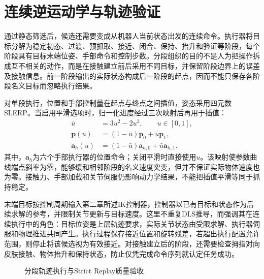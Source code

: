 \section{连续逆运动学与轨迹验证}
\label{sec:grasp_trajectory_verification}

通过静态筛选后，候选还需要变成从机器人当前状态出发的连续命令。执行器将目标分解为稳定初态、过渡、预抓取、接近、闭合、保持、抬升和验证等阶段，每个阶段具有目标末端位姿、手部命令和控制步数。分段组织的目的不是人为把操作拆成互不相关的动作，而是在接触建立前后采用不同目标，并保留阶段边界上的误差及接触信息。前一阶段输出的实际状态构成后一阶段的起点，因而不能只保存各阶段名义目标而忽略执行结果。

对单段执行，位置和手部控制量在起点与终点之间插值，姿态采用四元数SLERP。当启用平滑选项时，归一化进度经过三次映射后再用于插值：
\begin{equation}
 \begin{aligned}
 \bar u&=3u^2-2u^3,\qquad u\in[0,1],\\
 \boldsymbol p(u)&=(1-\bar u)\boldsymbol p_0+\bar u\boldsymbol p_1,\\
 \boldsymbol a_h(u)&=(1-\bar u)\boldsymbol a_{h,0}+\bar u\boldsymbol a_{h,1}.
 \end{aligned}
 \label{eq:ch03_segment_interpolation}
\end{equation}
其中，$\boldsymbol a_h$为六个手部执行器的位置命令；关闭平滑时直接使用$u$。该映射使参数曲线端点斜率为零，能够缓和相邻阶段的名义速度突变，但并不保证实际物体速度也为零。接触力、手部加载和关节伺服仍影响动力学结果，不能把插值平滑等同于抓持稳定。

末端目标按控制周期输入第二章所述IK控制器，控制器以已有目标和状态作为后续求解的参考，并限制关节更新与目标速度。这里不重复DLS推导，而强调其在连续执行中的角色：目标位姿是上层轨迹要求，实际关节状态由受限求解、执行器伺服和物理推进共同产生。执行过程保存接近位置和旋转残差，若超出执行配置允许范围，则停止将该候选视为有效接近。对接触建立后的阶段，还需要检查拇指对向皮肤接触、物体抬升和保持状态，防止仅凭完成命令序列就认定任务成功。

\begin{figure}[htbp]
 \centering
 \caption{分段轨迹执行与Strict Replay质量验收}
 \label{fig:ch03_strict_replay}
\end{figure}

